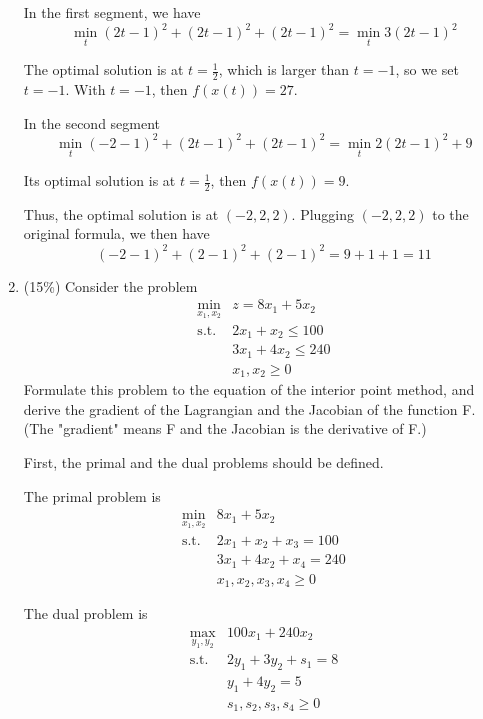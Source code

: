 \documentclass[a4paper,10pt]{article}
\begin{document}
\begin{enumerate}
{        In the first segment, we have 
        \[
            \min_{t} (2t - 1)^2 + (2t-1)^2 + (2t-1)^2 = \min_{t} 3(2t-1)^2
        \]

        The optimal solution is at $t = \frac{1}{2}$, which is larger than $t = -1$, so we set $t = -1$. With $t = -1$, then $f(x(t)) = 27$.

        In the second segment 
        \[
            \min_{t} (-2 - 1)^2 + (2t-1)^2 + (2t-1)^2 = \min_{t} 2(2t-1)^2 + 9
        \]

        Its optimal solution is at $t = \frac{1}{2}$, then $f(x(t)) = 9$.

        Thus, the optimal solution is at $(-2, 2, 2)$. Plugging $(-2, 2, 2)$ to the original formula, we then have
        \[
            (-2-1)^2 + (2-1)^2 + (2-1)^2 = 9 + 1 + 1 = 11
        \]
    }


\item (15\%) Consider the problem 
\begin{equation}\label{(3)}
    \begin{array}{cc}
        \displaystyle\min_{x_1,x_2} & z = 8x_1 + 5x_2 \\
        \mbox{s.t.} & 2x_1 + x_2 \le 100  \\
        & 3x_1 + 4x_2 \le 240   \\
        & x_1, x_2 \ge 0
    \end{array}
\end{equation}
Formulate this problem to the equation of the interior point method, and
derive the gradient of the Lagrangian and the Jacobian of the function F.
(The "gradient" means F and the Jacobian is the derivative of F.)

{\color{blue} 
First, the primal and the dual problems should be defined.

The primal problem is
\[
    \begin{array}{cc}
        \displaystyle\min_{x_1,x_2} & 8x_1 + 5x_2 \\
        \mbox{s.t.} & 2x_1 + x_2 + x_3 = 100  \\
        & 3x_1 + 4x_2 + x_4 = 240   \\
        & x_1, x_2, x_3, x_4 \ge 0
    \end{array}
\]

The dual problem is
\[
    \begin{array}{cc}
        \displaystyle \max_{y_1,y_2} & 100x_1 + 240x_2 \\
        \mbox{s.t.} & 2 y_1 + 3 y_2 + s_1 = 8  \\
        & y_1 + 4 y_2= 5 \\
        & s_1, s_2, s_3, s_4 \ge 0
    \end{array}
\]

}
\end{enumerate}
\end{document}
